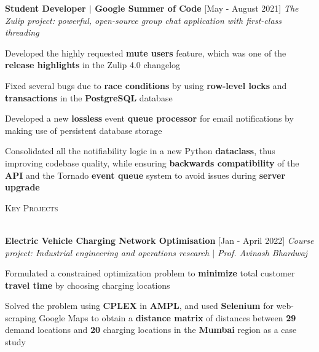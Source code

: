 \documentclass[10pt]{article}
\renewcommand{\section}[1]{
    \vspace*{3pt}
    \textsc{\Large{#1}}
    \vspace*{-8pt} \\ \hspace*{-5pt} 
    \hrulefill \\
    \vspace*{-15pt}
    \vspace*{-5pt}
}
\newcommand{\smallbullet}{
    \small$\bullet$
}
\newcommand{\bigblock}[3]{
    {
        \vspace*{2pt}
        \hspace*{-8pt} {\large{\textbf{#1}}} \hfill #2 \newline
        \textit{\textsf{#3}}
    }
}
\newenvironment{bullet-list-minor}{
    \begin{list}{
        \smallbullet
    }{
        \setlength\leftmargin{15pt}\topsep -5pt \itemsep -6pt
    }
} {
    \end{list}
}
\begin{document}

    \bigblock{
        Student Developer \(|\) Google Summer of Code
    }{
        [May - August 2021]
    }{
        The Zulip project: powerful, open-source group chat application with first-class threading
    }
    \begin{bullet-list-minor}
        \item Developed the highly requested \textbf{mute users} feature, which was one of the \textbf{release highlights} in the Zulip 4.0 changelog
        \item Fixed several bugs due to \textbf{race conditions} by using \textbf{row-level locks} and \textbf{transactions} in the \textbf{PostgreSQL} database
        \item Developed a new \textbf{lossless} event \textbf{queue processor} for email notifications by making use of persistent database storage
        \item Consolidated all the notifiability logic in a new Python \textbf{dataclass}, thus improving codebase quality, while ensuring \textbf{backwards compatibility} of the \textbf{API} and the Tornado \textbf{event queue} system to avoid issues during \textbf{server upgrade}
    \end{bullet-list-minor}


    \section{Key Projects}

    \bigblock{
        Electric Vehicle Charging Network Optimisation
    }{
        [Jan - April 2022]
    }{
        Course project: Industrial engineering and operations research \(|\) Prof. Avinash Bhardwaj
    }
	\begin{bullet-list-minor}
        \item Formulated a constrained optimization problem to \textbf{minimize} total customer \textbf{travel time} by choosing charging locations
        \item Solved the problem using \textbf{CPLEX} in \textbf{AMPL}, and used \textbf{Selenium} for web-scraping Google Maps to obtain a \textbf{distance matrix} of distances between \textbf{29} demand locations and \textbf{20} charging locations in the \textbf{Mumbai} region as a case study
    \end{bullet-list-minor}
\end{document}
